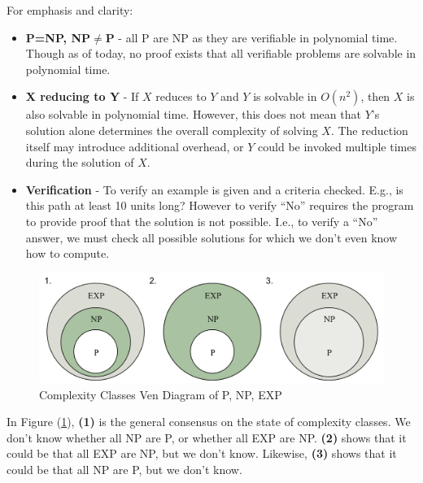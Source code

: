 \noindent
For emphasis and clarity:
\begin{theo}

    \begin{itemize}
        \item \textbf{P=NP, NP$\neq$P} - all P are NP as they are verifiable in polynomial time. Though as of today, no proof exists that all verifiable problems are solvable in polynomial time.
        \item \textbf{X reducing to Y} - If $X$ reduces to $Y$ and $Y$ is solvable in $O(n^2)$, then $X$ is also solvable in polynomial time. 
        However, this does not mean that $Y$'s solution alone determines the overall complexity of solving $X$. The reduction itself 
        may introduce additional overhead, or $Y$ could be invoked multiple times during the solution of $X$.

        \item \textbf{Verification} - To verify an example is given and a criteria checked. E.g., is this path at least 10 units long?
        However to verify ``No'' requires the program to provide proof that the solution is not possible. I.e., to verify a ``No'' answer, we must check all possible solutions for which 
        we don't even know how to compute.
    \end{itemize}
\end{theo}

\begin{figure}[h!]
    \centering
    \includegraphics[width=1\textwidth]{Sections/hard/diagrams.png}
    \caption{Complexity Classes Ven Diagram of P, NP, EXP}
    \label{fig:ven}
\end{figure}

In Figure (\ref{fig:ven}), \textbf{(1)} is the general consensus on the state of complexity classes. We don't know whether 
all NP are P, or whether all EXP are NP. \textbf{(2)} shows that it could be that all EXP are NP, but we don't know. Likewise, \textbf{(3)} shows that it could be that all NP are P, but we don't know.


